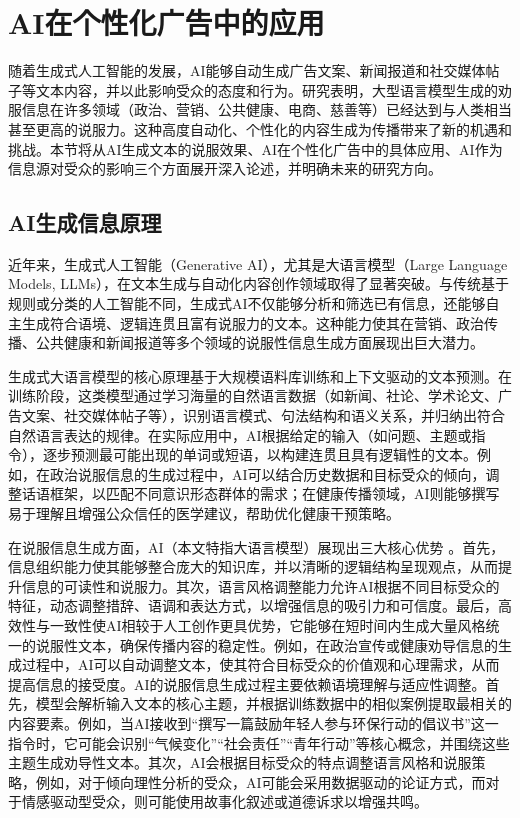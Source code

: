 \section{AI在个性化广告中的应用}
随着生成式人工智能的发展，AI能够自动生成广告文案、新闻报道和社交媒体帖子等文本内容，并以此影响受众的态度和行为。研究表明，大型语言模型生成的劝服信息在许多领域（政治、营销、公共健康、电商、慈善等）已经达到与人类相当甚至更高的说服力。这种高度自动化、个性化的内容生成为传播带来了新的机遇和挑战。本节将从AI生成文本的说服效果、AI在个性化广告中的具体应用、AI作为信息源对受众的影响三个方面展开深入论述，并明确未来的研究方向。

\subsection{AI生成信息原理}

近年来，生成式人工智能（Generative AI），尤其是大语言模型（Large Language Models, LLMs），在文本生成与自动化内容创作领域取得了显著突破。与传统基于规则或分类的人工智能不同，生成式AI不仅能够分析和筛选已有信息，还能够自主生成符合语境、逻辑连贯且富有说服力的文本。这种能力使其在营销、政治传播、公共健康和新闻报道等多个领域的说服性信息生成方面展现出巨大潜力。

生成式大语言模型的核心原理基于大规模语料库训练和上下文驱动的文本预测。在训练阶段，这类模型通过学习海量的自然语言数据（如新闻、社论、学术论文、广告文案、社交媒体帖子等），识别语言模式、句法结构和语义关系，并归纳出符合自然语言表达的规律。在实际应用中，AI根据给定的输入（如问题、主题或指令），逐步预测最可能出现的单词或短语，以构建连贯且具有逻辑性的文本。例如，在政治说服信息的生成过程中，AI可以结合历史数据和目标受众的倾向，调整话语框架，以匹配不同意识形态群体的需求；在健康传播领域，AI则能够撰写易于理解且增强公众信任的医学建议，帮助优化健康干预策略。

在说服信息生成方面，AI（本文特指大语言模型）展现出三大核心优势 \citep{breum2024persuasive}。首先，信息组织能力使其能够整合庞大的知识库，并以清晰的逻辑结构呈现观点，从而提升信息的可读性和说服力。其次，语言风格调整能力允许AI根据不同目标受众的特征，动态调整措辞、语调和表达方式，以增强信息的吸引力和可信度。最后，高效性与一致性使AI相较于人工创作更具优势，它能够在短时间内生成大量风格统一的说服性文本，确保传播内容的稳定性。例如，在政治宣传或健康劝导信息的生成过程中，AI可以自动调整文本，使其符合目标受众的价值观和心理需求，从而提高信息的接受度。AI的说服信息生成过程主要依赖语境理解与适应性调整。首先，模型会解析输入文本的核心主题，并根据训练数据中的相似案例提取最相关的内容要素。例如，当AI接收到“撰写一篇鼓励年轻人参与环保行动的倡议书”这一指令时，它可能会识别“气候变化”“社会责任”“青年行动”等核心概念，并围绕这些主题生成劝导性文本。其次，AI会根据目标受众的特点调整语言风格和说服策略，例如，对于倾向理性分析的受众，AI可能会采用数据驱动的论证方式，而对于情感驱动型受众，则可能使用故事化叙述或道德诉求以增强共鸣。

